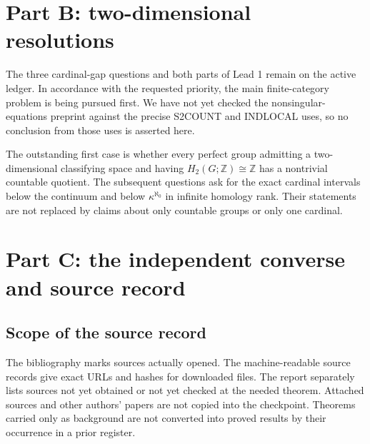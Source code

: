 \documentclass[11pt]{article}
\begin{document}
\section{Part B: two-dimensional resolutions}
\label{CP2:partB}
The three cardinal-gap questions and both parts of Lead 1 remain on the
active ledger. In accordance with the requested priority, the main
finite-category problem is being pursued first. We have not yet checked
the nonsingular-equations preprint against the precise S2COUNT and
INDLOCAL uses, so no conclusion from those uses is asserted here.

The outstanding first case is whether every perfect group admitting a
two-dimensional classifying space and having $H_2(G;\mathbb Z)\cong
\mathbb Z$ has a nontrivial countable quotient. The subsequent questions
ask for the exact cardinal intervals below the continuum and below
$\kappa^{\aleph_0}$ in infinite homology rank. Their statements are not
replaced by claims about only countable groups or only one cardinal.

\section{Part C: the independent converse and source record}
\label{CP2:partC}

\subsection{Scope of the source record}
The bibliography marks sources actually opened. The machine-readable
source records give exact URLs and hashes for downloaded files. The
report separately lists sources not yet obtained or not yet checked at
the needed theorem. Attached sources and other authors' papers are not
copied into the checkpoint. Theorems carried only as background are not
converted into proved results by their occurrence in a prior register.



\end{document}
